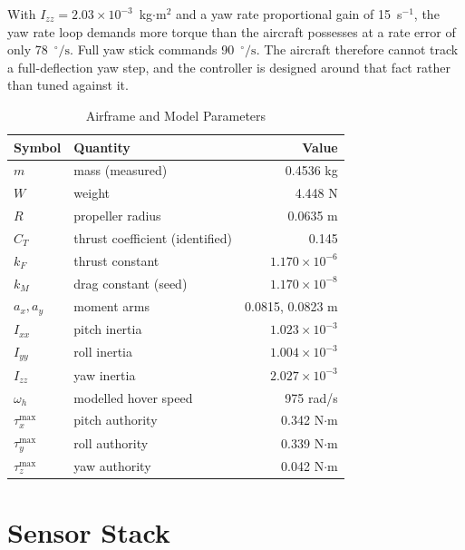 \documentclass[conference]{IEEEtran}
\newcommand{\kF}{k_{F}}
\newcommand{\kM}{k_{M}}
\newcommand{\dps}{\ensuremath{^{\circ}\!/\mathrm{s}}}
\begin{document}
With $I_{zz}=2.03\times10^{-3}$~kg$\cdot$m$^{2}$ and a yaw rate proportional
gain of 15~s$^{-1}$, the yaw rate loop demands more torque than the aircraft
possesses at a rate error of only 78~\dps. Full yaw stick commands 90~\dps.
The aircraft therefore cannot track a full-deflection yaw step, and the
controller is designed around that fact rather than tuned against it.

\begin{table}[!t]
\caption{Airframe and Model Parameters}
\label{tab:params}
\centering
\footnotesize
\begin{tabular}{@{}llr@{}}
\toprule
Symbol & Quantity & Value \\
\midrule
$m$        & mass (measured)              & 0.4536 kg \\
$W$        & weight                       & 4.448 N \\
$R$        & propeller radius             & 0.0635 m \\
$C_T$      & thrust coefficient (identified) & 0.145 \\
$\kF$      & thrust constant              & $1.170\times10^{-6}$ \\
$\kM$      & drag constant (seed)         & $1.170\times10^{-8}$ \\
$a_x, a_y$ & moment arms                  & 0.0815, 0.0823 m \\
$I_{xx}$   & pitch inertia                & $1.023\times10^{-3}$ \\
$I_{yy}$   & roll inertia                 & $1.004\times10^{-3}$ \\
$I_{zz}$   & yaw inertia                  & $2.027\times10^{-3}$ \\
$\omega_h$ & modelled hover speed         & 975 rad/s \\
$\tau_x^{\max}$ & pitch authority         & 0.342 N$\cdot$m \\
$\tau_y^{\max}$ & roll authority          & 0.339 N$\cdot$m \\
$\tau_z^{\max}$ & yaw authority           & 0.042 N$\cdot$m \\
\bottomrule
\end{tabular}
\end{table}

\section{Sensor Stack}
\label{sec:sensors}
\end{document}

